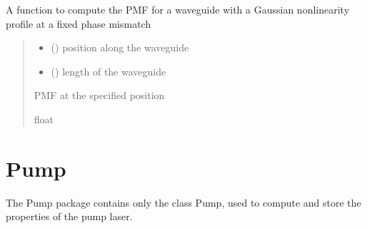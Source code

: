\documentclass[a4paper,10pt,english]{sphinxmanual}
\begin{document}
\begin{fulllineitems}
\label{\detokenize{waveguide:pyjsa.waveguide.pmf_gaussian}}
\pysigstartsignatures
{}
\pysigstopsignatures
\sphinxAtStartPar
A function to compute the PMF for a waveguide with a Gaussian nonlinearity profile at a fixed phase mismatch
\begin{quote}\begin{description}
\begin{itemize}
\item {} 
\sphinxAtStartPar
{} () \textendash{} position along the waveguide

\item {} 
\sphinxAtStartPar
{} () \textendash{} length of the waveguide

\end{itemize}

\sphinxAtStartPar
PMF at the specified position

\sphinxAtStartPar
float

\end{description}\end{quote}

\end{fulllineitems}


\sphinxstepscope


\chapter{Pump}
\label{\detokenize{pump:module-pyjsa.pump}}\label{\detokenize{pump:pump}}\label{\detokenize{pump::doc}}
\sphinxAtStartPar
The Pump package contains only the class Pump, used to compute and store the properties of the pump laser.
\end{document}
